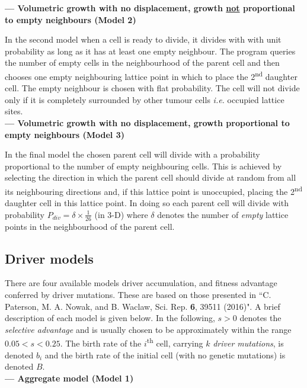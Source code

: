 \documentclass[12pt]{article}
\begin{document}
 \clearpage


\indent \textbf{--- Volumetric growth with no displacement, growth \underline{not} proportional to empty neighbours (Model 2)}

In the second model when a cell is ready to divide, it divides with with unit probability as long as it has at least one empty neighbour. The program queries the number of empty cells in the neighbourhood of the parent cell and then chooses one empty neighbouring lattice point in which to place the 2\textsuperscript{nd} daughter cell. The empty neighbour is chosen with flat probability. The cell will not divide only if it is completely surrounded by other tumour cells \textit{i.e.} occupied lattice sites.\\

\indent \textbf{--- Volumetric growth with no displacement, growth proportional to empty neighbours (Model 3)}

In the final model the chosen parent cell will divide with a probability proportional to the number of empty neighbouring cells. This is achieved by selecting the direction in which the parent cell should divide at random from all its neighbouring directions and, if this lattice point is unoccupied, placing the 2\textsuperscript{nd} daughter cell in this lattice point. In doing so each parent cell will divide with probability $P_{div} = \delta \times \frac{1}{26}$ (in 3-D) where $\delta$ denotes the number of \textit{empty} lattice points in the neighbourhood of the parent cell.\\


\subsection*{Driver models}

There are four available models driver accumulation, and fitness advantage conferred by driver mutations. These are based on those presented in ``C. Paterson, M. A. Nowak, and B. Waclaw, Sci. Rep. \textbf{6}, 39511 (2016)". A brief description of each model is given below. In the following, $s > 0$ denotes the \textit{selective advantage} and is usually chosen to be approximately within the range $0.05 < s <0.25$. The birth rate of the $i$\textsuperscript{th} cell, carrying $k$ \textit{driver mutations}, is denoted $b_{i}$ and the birth rate of the initial cell (with no genetic mutations) is denoted $B$.\\

\indent \textbf{---  Aggregate model (Model 1)}
\end{document}
